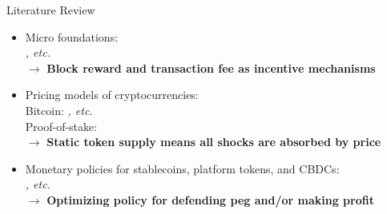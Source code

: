 \documentclass{beamer}
\begin{document}
\begin{frame}{Literature Review}
    \begin{itemize}
        \item Micro foundations:\\
        {\footnotesize \textit{\citet{nisan2007algorithmic, budish2018economic, biais2019blockchain, gans2019more, gans2022mechanism, huberman2021monopoly}, etc.}}\\
        $\rightarrow$ \textbf{Block reward and transaction fee as incentive mechanisms}

        \item Pricing models of cryptocurrencies:\\
        {\footnotesize Bitcoin: \textit{\citet{athey2016bitcoin, garratt2018bitcoin, schilling2019some, schilling2019currency, catalini2020some, biais2020equilibrium, bolt2020value, hinzen2022bitcoin, chiu2017economics}, etc.}}\\
        {\footnotesize Proof-of-stake: \textit{\citet{catalini2020markets, saleh2019volatility, saleh2021blockchain}}}\\
        $\rightarrow$ \textbf{Static token supply means all shocks are absorbed by price}
        \item Monetary policies for stablecoins, platform tokens, and CBDCs:\\
        {\footnotesize \textit{\citet{cong2021tokenomics, cong2022token, d2022can, fernandez2021central, zhu2019framework, sockin2023model, sockin2023decentralization}, etc.}}\\
        $\rightarrow$ \textbf{Optimizing policy for defending peg and/or making profit}
    \end{itemize}
\end{frame}
\end{document}
